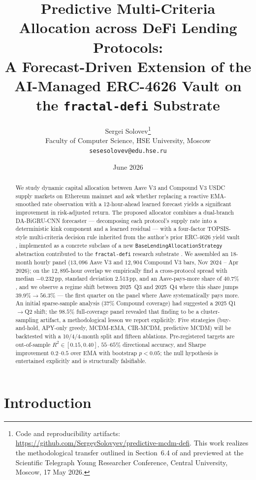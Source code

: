 \documentclass[11pt,a4paper]{article}
\title{Predictive Multi-Criteria Allocation across DeFi Lending Protocols:\\
       \large A Forecast-Driven Extension of the AI-Managed ERC-4626 Vault
              on the \texttt{fractal-defi} Substrate}
\author{Sergei Solovev\thanks{Code and reproducibility artifacts:
  \url{https://github.com/SergeySolovyev/predictive-mcdm-defi}.
  This work realizes the methodological transfer outlined in
  Section~6.4 of \cite{solovev2026lob} and previewed at the
  Scientific Telegraph Young Researcher Conference,
  Central University, Moscow, 17 May 2026.}\\
  \small Faculty of Computer Science, HSE University, Moscow\\
  \small \texttt{sesesolovev@edu.hse.ru}}
\date{June 2026}
\begin{document}
\maketitle

\begin{abstract}
\noindent
We study dynamic capital allocation between Aave V3 and Compound V3
USDC supply markets on Ethereum mainnet and ask whether replacing a
reactive EMA-smoothed rate observation with a 12-hour-ahead learned
forecast yields a significant improvement in risk-adjusted return.
The proposed allocator combines a dual-branch DA-BiGRU-CNN forecaster
--- decomposing each protocol's supply rate into a deterministic kink
component and a learned residual --- with a four-factor TOPSIS-style
multi-criteria decision rule inherited from the author's prior
ERC-4626 yield vault \cite{solovev2026vault}, implemented as a
concrete subclass of a new \texttt{BaseLendingAllocationStrategy}
abstraction contributed to the \texttt{fractal-defi} research
substrate \cite{fractaldefi2026,krestenko2026basis}. We assembled an
18-month hourly panel ($13{,}096$ Aave V3 and $12{,}904$ Compound V3
bars, Nov 2024 -- Apr 2026); on the $12{,}895$-hour overlap we
empirically find a cross-protocol spread with median $-0.232$\,pp,
standard deviation $2.513$\,pp, and an Aave-pays-more share of
$40.7\%$, and we observe a regime shift between 2025~Q3 and 2025~Q4
where this share jumps $39.9\% \to 56.3\%$ --- the first quarter on
the panel where Aave systematically pays more. An initial
sparse-sample analysis ($37\%$ Compound coverage) had suggested a
2025 Q1$\to$Q2 shift; the $98.5\%$ full-coverage panel revealed that
finding to be a cluster-sampling artifact, a methodological lesson we
report explicitly. Five strategies (buy-and-hold, APY-only greedy,
MCDM-EMA, CIR-MCDM, predictive MCDM) will be backtested with a
10/4/4-month split and fifteen ablations. Pre-registered targets are
out-of-sample $R^2 \in [0.15,0.40]$, $55$--$65\%$ directional accuracy,
and Sharpe improvement $0.2$--$0.5$ over EMA with bootstrap $p<0.05$;
the null hypothesis is entertained explicitly and is structurally
falsifiable.
\end{abstract}

\section{Introduction}
\label{sec:introduction}
\end{document}
